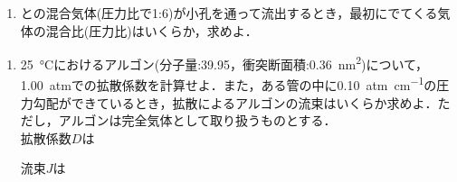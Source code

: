 \documentclass[uplatex,dvipdfmx,a4paper,10pt]{jsarticle}
\def\tightlist{\itemsep1pt\parskip0pt\parsep0pt}
\begin{document}
\begin{enumerate}
\def\labelenumi{\arabic{enumi}.}
\setcounter{enumi}{6}
\tightlist
\item
  との混合気体(圧力比で1:6)が小孔を通って流出するとき，最初にでてくる気体の混合比(圧力比)はいくらか，求めよ．
\end{enumerate}




\begin{enumerate}
\def\labelenumi{\arabic{enumi}.}
\setcounter{enumi}{7}
\item
  \SI{25}{\degreeCelsius}におけるアルゴン(分子量:39.95，衝突断面積:\SI{0.36}{nm^{2}})について，\SI{1.00}{atm}での拡散係数を計算せよ．また，ある管の中に\SI{0.10}{atm.cm^{-1}}の圧力勾配ができているとき，拡散によるアルゴンの流束はいくらか求めよ．ただし，アルゴンは完全気体として取り扱うものとする．
  \\

  拡散係数\(D\)は%

  流束\(J\)は
\end{enumerate}

\printbibliography[title=参考文献]
\end{document}
